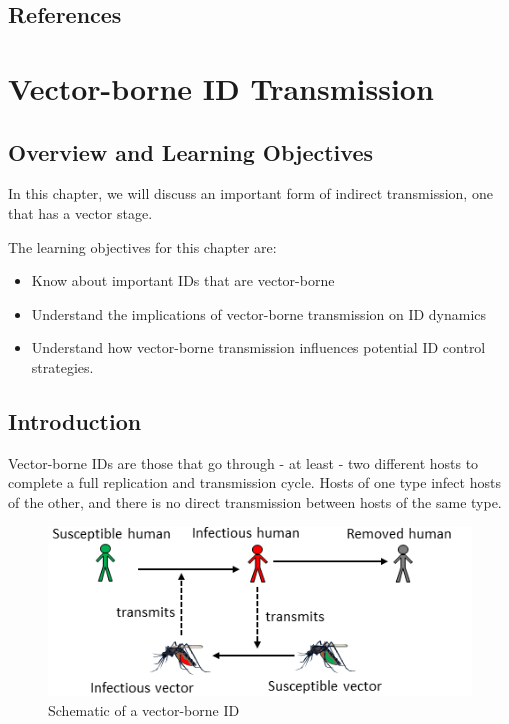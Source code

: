 \documentclass[]{article}
\providecommand{\tightlist}{%
  \setlength{\itemsep}{0pt}\setlength{\parskip}{0pt}}
\theoremstyle{definition}
\theoremstyle{definition}
\theoremstyle{definition}
\theoremstyle{remark}
\begin{document}
\subsection{References}\label{references-7}

\section{Vector-borne ID
Transmission}\label{vector-borne-id-transmission}

\subsection{Overview and Learning
Objectives}\label{overview-and-learning-objectives-7}

In this chapter, we will discuss an important form of indirect
transmission, one that has a vector stage.

The learning objectives for this chapter are:

\begin{itemize}
\tightlist
\item
  Know about important IDs that are vector-borne
\item
  Understand the implications of vector-borne transmission on ID
  dynamics
\item
  Understand how vector-borne transmission influences potential ID
  control strategies.
\end{itemize}

\subsection{Introduction}\label{introduction-7}

Vector-borne IDs are those that go through - at least - two different
hosts to complete a full replication and transmission cycle. Hosts of
one type infect hosts of the other, and there is no direct transmission
between hosts of the same type.

\begin{figure}
\centering
\includegraphics{./images/vectorborne-schematic.png}
\caption{Schematic of a vector-borne ID}
\end{figure}
\end{document}
